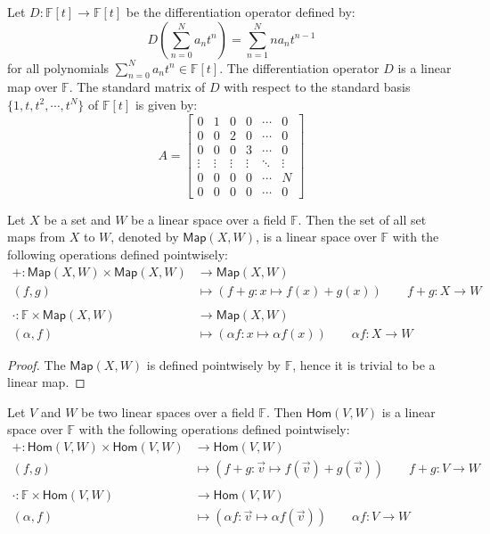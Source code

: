 \documentclass[
	11pt, %
	fleqn, %
	a4paper, %
]{LegrandOrangeBook}
\newcommand{\Hom}{\mathsf{Hom}} %
\newcommand{\F}{\mathbb{F}} %
\newcommand{\Map}{\mathsf{Map}} %
\begin{document}
\begin{example}
    Let $D: \F[t] \to \F[t]$ be the differentiation operator defined by:
    \[
        D\left( \sum_{n=0}^{N} a_n t^n \right) = \sum_{n=1}^{N} n a_n t^{n-1}
    \]
    for all polynomials $\sum_{n=0}^{N} a_n t^n \in \F[t]$. The differentiation operator $D$ is a linear map over $\F$. The standard matrix of $D$ with respect to the standard basis $\{1, t, t^2, \cdots, t^N\}$ of $\F[t]$ is given by:
    \[
        A = \begin{bmatrix}
            0 & 1 & 0 & 0 & \cdots & 0 \\
            0 & 0 & 2 & 0 & \cdots & 0 \\
            0 & 0 & 0 & 3 & \cdots & 0 \\
            \vdots & \vdots & \vdots & \vdots & \ddots & \vdots \\
            0 & 0 & 0 & 0 & \cdots & N \\
            0 & 0 & 0 & 0 & \cdots & 0
        \end{bmatrix}
    \]
\end{example}

\begin{proposition}
    Let $X$ be a set and $W$ be a linear space over a field $\F$. Then the set of all set maps from $X$ to $W$, denoted by $\Map(X, W)$, is a linear space over $\F$ with the following operations defined pointwisely:
    \[
        \begin{split}
            + : \Map(X, W) \times \Map(X, W) &\to \Map(X, W) \\
            (f,g) &\mapsto (f+g: x \mapsto f(x) + g(x)) \qquad f + g : X \to W \\ \\
            \cdot : \F \times \Map(X, W) &\to \Map(X, W) \\
            (\alpha,f) &\mapsto (\alpha f: x \mapsto \alpha f(x)) \qquad \alpha f : X \to W
        \end{split}
    \]
\end{proposition}

\begin{proof}
    The $\Map(X, W)$ is defined pointwisely by $\F$, hence it is trivial to be a linear map.
\end{proof}

\begin{proposition}
    Let $V$ and $W$ be two linear spaces over a field $\F$. Then $\Hom(V, W)$ is a linear space over $\F$ with the following operations defined pointwisely:
    \[
        \begin{split}
            + : \Hom(V, W) \times \Hom(V, W) &\to \Hom(V, W) \\
            (f,g) &\mapsto (f+g: \vec{v} \mapsto f(\vec{v}) + g(\vec{v})) \qquad f + g : V \to W \\ \\
            \cdot : \F \times \Hom(V, W) &\to \Hom(V, W) \\
            (\alpha,f) &\mapsto (\alpha f: \vec{v} \mapsto \alpha f(\vec{v})) \qquad \alpha f : V \to W
        \end{split}
    \]
\end{proposition}
\end{document}
